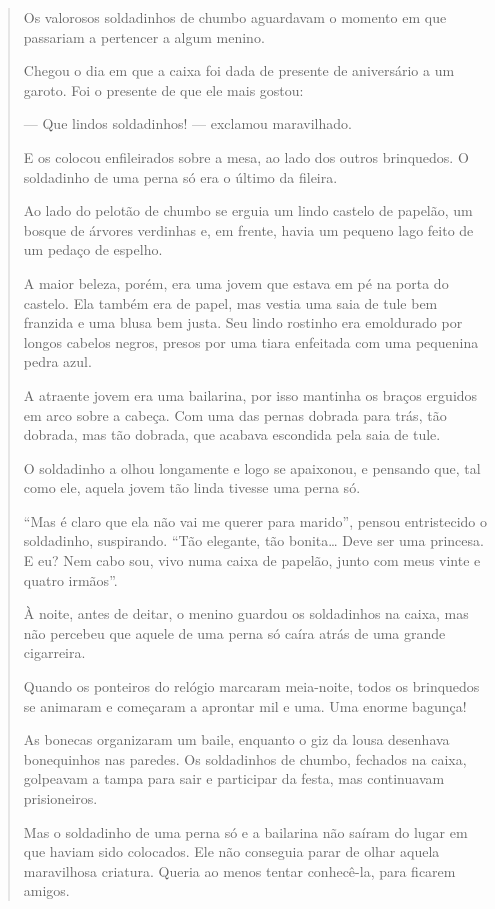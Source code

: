 \begin{escolha}
\begin{escolha}
{\begin{escolha}
\begin{quote}
Os valorosos soldadinhos de chumbo aguardavam o momento em que passariam
a pertencer a algum menino.

Chegou o dia em que a caixa foi dada de presente de aniversário a um
garoto. Foi o presente de que ele mais gostou:

--- Que lindos soldadinhos! --- exclamou maravilhado.

E os colocou enfileirados sobre a mesa, ao lado dos outros brinquedos. O
soldadinho de uma perna só era o último da fileira.

Ao lado do pelotão de chumbo se erguia um lindo castelo de papelão, um
bosque de árvores verdinhas e, em frente, havia um pequeno lago feito de
um pedaço de espelho.

A maior beleza, porém, era uma jovem que estava em pé na porta do
castelo. Ela também era de papel, mas vestia uma saia de tule bem
franzida e uma blusa bem justa. Seu lindo rostinho era emoldurado por
longos cabelos negros, presos por uma tiara enfeitada com uma pequenina
pedra azul.

A atraente jovem era uma bailarina, por isso mantinha os braços erguidos
em arco sobre a cabeça. Com uma das pernas dobrada para trás, tão
dobrada, mas tão dobrada, que acabava escondida pela saia de tule.

O soldadinho a olhou longamente e logo se apaixonou, e pensando que, tal
como ele, aquela jovem tão linda tivesse uma perna só.

``Mas é claro que ela não vai me querer para marido'', pensou
entristecido o soldadinho, suspirando. ``Tão elegante, tão
bonita\ldots{} Deve ser uma princesa. E eu? Nem cabo sou, vivo numa
caixa de papelão, junto com meus vinte e quatro
irmãos''.

À noite, antes de deitar, o menino guardou os soldadinhos na caixa, mas
não percebeu que aquele de uma perna só caíra atrás de uma grande
cigarreira.

Quando os ponteiros do relógio marcaram meia-noite, todos os brinquedos
se animaram e começaram a aprontar mil e uma. Uma enorme bagunça!

As bonecas organizaram um baile, enquanto o giz da lousa desenhava
bonequinhos nas paredes. Os soldadinhos de chumbo, fechados na caixa,
golpeavam a tampa para sair e participar da festa, mas continuavam
prisioneiros.

Mas o soldadinho de uma perna só e a bailarina não saíram do lugar em
que haviam sido colocados. Ele não conseguia parar de olhar aquela
maravilhosa criatura. Queria ao menos tentar conhecê-la, para ficarem
amigos.


\end{quote}
\end{escolha}}
\end{escolha}
\end{escolha}
